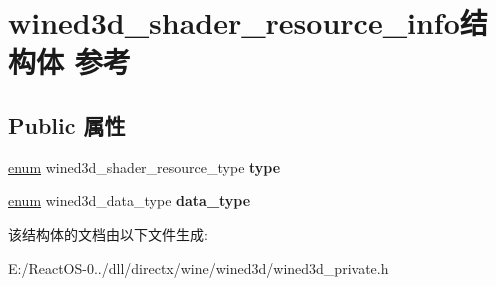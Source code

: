\hypertarget{structwined3d__shader__resource__info}{}\section{wined3d\+\_\+shader\+\_\+resource\+\_\+info结构体 参考}
\label{structwined3d__shader__resource__info}
\subsection*{Public 属性}
\begin{DoxyCompactItemize}
\item 
\mbox{\label{structwined3d__shader__resource__info_a0c354efe63258eacb4b5e8d92d4ada3b}} 
\hyperlink{interfaceenum}{enum} wined3d\+\_\+shader\+\_\+resource\+\_\+type {\bfseries type}
\item 
\mbox{\label{structwined3d__shader__resource__info_a92f801871f616e861061767880f5b927}} 
\hyperlink{interfaceenum}{enum} wined3d\+\_\+data\+\_\+type {\bfseries data\+\_\+type}
\end{DoxyCompactItemize}


该结构体的文档由以下文件生成\+:\begin{DoxyCompactItemize}
\item 
E\+:/\+React\+O\+S-\/0../dll/directx/wine/wined3d/wined3d\+\_\+private.\+h\end{DoxyCompactItemize}
